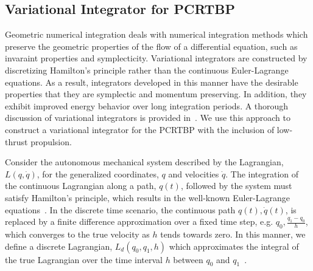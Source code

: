\documentclass[smallcondensed]{svjour3}
\begin{document}
\subsection{Variational Integrator for PCRTBP}\label{sec:discrete_var}
Geometric numerical integration deals with numerical integration methods which preserve the geometric properties of the flow of a differential equation, such as invaraint properties and symplecticity.
Variational integrators are constructed by discretizing Hamilton's principle rather than the continuous Euler-Lagrange equations.
As a result, integrators developed in this manner have the desirable properties that they are symplectic and momentum preserving.
In addition, they exhibit improved energy behavior over long integration periods.
A thorough discussion of variational integrators is provided in~\cite{west2004,marsden2001}.
We use this approach to construct a variational integrator for the PCRTBP with the inclusion of low-thrust propulsion.

Consider the autonomous mechanical system described by the Lagrangian, \( L(q, \dot{q} ) \), for the generalized coordinates, \( q\) and velocities \( \dot{q} \).
The integration of the continuous Lagrangian along a path, \( q (t) \), followed by the system must satisfy Hamilton's principle, which results in the well-known Euler-Lagrange equations~\cite{lanczos1970}.
In the discrete time scenario, the continuous path \( q(t), \dot{q}(t) \), is replaced by a finite difference approximation over a fixed time step, e.g. \( q_0, \frac{q_1 - q_0}{h} \), which converges to the true velocity as \( h \) tends towards zero.
In this manner, we define a discrete Lagrangian, \( L_d (q_0, q_1, h) \) which approximates the integral of the true Lagrangian over the time interval \( h \) between \( q_0 \) and \( q_1\)~\cite{marsden2001}.
\end{document}
